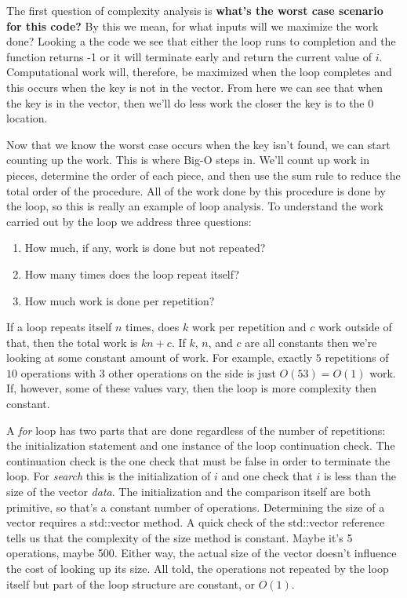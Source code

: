 \documentclass[]{tufte-handout}
\begin{document}
The first question of complexity analysis is \textbf{what's the worst case scenario for this code?} By this we mean, for what inputs will we maximize the work done? Looking a the code we see that either the loop runs to completion and the function returns -1 or it will terminate early and return the current value of $i$. Computational work will, therefore, be maximized when the loop completes and this occurs when the key is not in the vector. From here we can see that when the key is in the vector, then we'll do less work the closer the key is to the $0$ location.

Now that we know the worst case occurs when the key isn't found, we can start counting up the work. This is where Big-O steps in. We'll count up work in pieces, determine the order of each piece, and then use the sum rule to reduce the total order of the procedure. All of the work done by this procedure is done by the loop, so this is really an example of loop analysis. To understand the work carried out by the loop we address three questions:
\begin{enumerate}
\item How much, if any, work is done but not repeated?
\item How many times does the loop repeat itself?
\item How much work is done per repetition?
\end{enumerate}
If a loop repeats itself $n$ times, does $k$ work per repetition and $c$ work outside of that, then the total work is $kn+c$. If $k$, $n$, and $c$ are all constants then we're looking at some constant amount of work. For example, exactly $5$ repetitions of $10$ operations with $3$ other operations on the side is just $O(53) = O(1)$ work. If, however, some of these values vary, then the loop is more complexity then constant.

A \textit{for} loop has two parts that are done regardless of the number of repetitions: the initialization statement and one instance of the loop continuation check. The continuation check is the one check that must be false in order to terminate the loop. For \textit{search} this is the initialization of $i$ and one check that $i$ is less than the size of the vector \textit{data}. The initialization and the comparison itself are both primitive, so that's a constant number of operations. Determining the size of a vector requires a std::vector method.  A quick check of the std::vector reference tells us that the complexity of the size method is constant. Maybe it's 5 operations, maybe 500. Either way, the actual size of the vector doesn't influence the cost of looking up its size. All told, the operations not repeated by the loop itself but part of the loop structure are constant, or $O(1)$.
\end{document}
